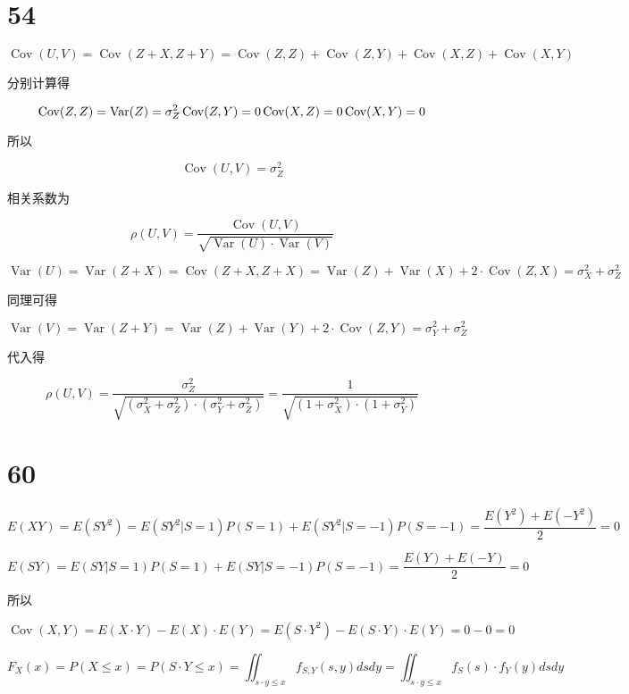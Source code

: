 \documentclass[]{article}
\date{}
\begin{document}
\section{54}\label{header-n0}

\[\operatorname{Cov}(U, V)=\operatorname{Cov}(Z+X, Z+Y)=\operatorname{Cov}(Z, Z)+\operatorname{Cov}(Z, Y)+\operatorname{Cov}(X, Z)+\operatorname{Cov}(X, Y)\]

分别计算得

\[\operatorname{Cov}(Z, Z)=\operatorname{Var}(Z)=\sigma_Z^2
\\
\operatorname{Cov}(Z, Y)=0
\\
\operatorname{Cov}(X, Z)=0
\\
\operatorname{Cov}(X, Y)=0\]

所以

\[\operatorname{Cov}(U, V)=\sigma_Z^2\]

相关系数为

\[\rho(U, V)=\frac{\operatorname{Cov}(U, V)}{\sqrt{\operatorname{Var}(U) \cdot \operatorname{Var}(V)}}\]

\[\operatorname{Var}(U)=\operatorname{Var}(Z+X)=\operatorname{Cov}(Z+X,Z+X)=\operatorname{Var}(Z)+\operatorname{Var}(X)+2 \cdot \operatorname{Cov}(Z, X)=\sigma_{X}^{2}+\sigma_{Z}^{2}\]

同理可得

\[\operatorname{Var}(V)=\operatorname{Var}(Z+Y)=\operatorname{Var}(Z)+\operatorname{Var}(Y)+2 \cdot \operatorname{Cov}(Z, Y)=\sigma_{Y}^{2}+\sigma_{Z}^{2}\]

代入得

\[\rho(U, V)=\frac{\sigma_{Z}^{2}}{\sqrt{\left(\sigma_{X}^{2}+\sigma_{Z}^{2}\right) \cdot\left(\sigma_{Y}^{2}+\sigma_{Z}^{2}\right)}}=\frac{1}{\sqrt{\left(1+\sigma_{X}^{2}\right) \cdot\left(1+\sigma_{Y}^{2}\right)}}\]

\section{60}\label{header-n14}

\[E(XY)=E(SY^2)=E(SY^2|S=1)P(S=1)+E(SY^2|S=-1)P(S=-1)=\frac{E(Y^2)+E(-Y^2)}{2}=0\]

\[E(SY)=E(SY|S=1)P(S=1)+E(SY|S=-1)P(S=-1)=\frac{E(Y)+E(-Y)}{2}=0\]

所以

\[\operatorname{Cov}(X, Y)=E(X \cdot Y)-E(X) \cdot E(Y)=E\left(S \cdot Y^{2}\right)-E(S \cdot Y) \cdot E(Y)=0-0=0\]

\[F_{X}(x)=P(X \leq x)=P(S \cdot Y \leq x)=\iint_{s \cdot y \leq x} f_{S, Y}(s, y) d s d y=\iint_{s \cdot y \leq x} f_{S}(s) \cdot f_{Y}(y) d s d y\]
\end{document}
